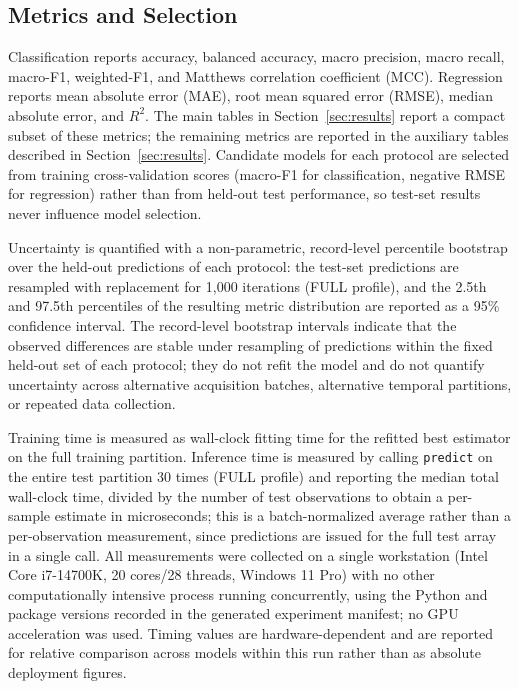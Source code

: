 \documentclass[conference]{IEEEtran}
\begin{document}
\subsection{Metrics and Selection}
Classification reports accuracy, balanced accuracy, macro precision, macro recall, macro-F1, weighted-F1, and Matthews correlation coefficient (MCC). Regression reports mean absolute error (MAE), root mean squared error (RMSE), median absolute error, and $R^2$. The main tables in Section~\ref{sec:results} report a compact subset of these metrics; the remaining metrics are reported in the auxiliary tables described in Section~\ref{sec:results}. Candidate models for each protocol are selected from training cross-validation scores (macro-F1 for classification, negative RMSE for regression) rather than from held-out test performance, so test-set results never influence model selection.

Uncertainty is quantified with a non-parametric, record-level percentile bootstrap over the held-out predictions of each protocol: the test-set predictions are resampled with replacement for 1,000 iterations (FULL profile), and the 2.5th and 97.5th percentiles of the resulting metric distribution are reported as a 95\% confidence interval. The record-level bootstrap intervals indicate that the observed differences are stable under resampling of predictions within the fixed held-out set of each protocol; they do not refit the model and do not quantify uncertainty across alternative acquisition batches, alternative temporal partitions, or repeated data collection.

Training time is measured as wall-clock fitting time for the refitted best estimator on the full training partition. Inference time is measured by calling \texttt{predict} on the entire test partition 30 times (FULL profile) and reporting the median total wall-clock time, divided by the number of test observations to obtain a per-sample estimate in microseconds; this is a batch-normalized average rather than a per-observation measurement, since predictions are issued for the full test array in a single call. All measurements were collected on a single workstation (Intel Core i7-14700K, 20 cores/28 threads, Windows 11 Pro) with no other computationally intensive process running concurrently, using the Python and package versions recorded in the generated experiment manifest; no GPU acceleration was used. Timing values are hardware-dependent and are reported for relative comparison across models within this run rather than as absolute deployment figures.
\end{document}
